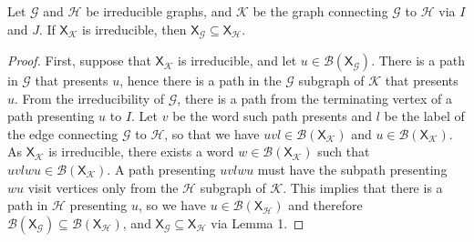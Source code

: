 \documentclass{article}
\newcommand{\Gc}{\mathcal{G}}  %
\newcommand{\Hc}{\mathcal{H}}  %
\newcommand{\Bc}{\mathcal{B}}
\newcommand{\Kc}{\mathcal{K}}
\newcommand{\shift}[1]{\mathsf{X}_{#1}}
\theoremstyle{definition}
\begin{document}
    \begin{theorem}
        Let \(\Gc\) and \(\Hc\) be irreducible graphs, and \(\Kc\) be the graph connecting 
        \(\Gc\) to \(\Hc\) via \(I\) and \(J\).
        If \(\shift{\Kc}\) is irreducible, then
        \(\shift{\Gc} \subseteq \shift{\Hc}\).
    \end{theorem}

    \begin{proof}
        First, suppose that \(\shift{\Kc}\) is irreducible, and let \(u \in \Bc(\shift{\Gc})\). 
        There is a path in \(\Gc\) that presents \(u\), hence there is a path in the 
        \(\Gc\) subgraph of \(\Kc\) that presents \(u\). From the irreducibility of 
        \(\Gc\), there is a path from the terminating vertex of a path presenting 
        \(u\) to \(I\). Let \(v\) be the word such path presents and \(l\) be 
        the label of the edge connecting \(\Gc\) to \(\Hc\), so that we have 
        \(uvl \in \Bc(\shift{\Kc})\) and \(u \in \Bc(\shift{\Kc})\). As \(\shift{\Kc}\)
        is irreducible, there exists a word \(w \in \Bc(\shift{\Kc})\) such that 
        \(uvlwu \in \Bc(\shift{\Kc})\). A path presenting \(uvlwu\) must have the 
        subpath presenting \(wu\) visit vertices only from the \(\Hc\) subgraph of \(\Kc\).
        This implies that there is a path in \(\Hc\) presenting \(u\), so we have 
        \(u \in \Bc(\shift{\Hc})\) and therefore \(\Bc(\shift{\Gc}) \subseteq \Bc(\shift{\Hc})\),
        and \(\shift{\Gc} \subseteq \shift{\Hc}\) via Lemma 1.

\end{proof}
\end{document}
